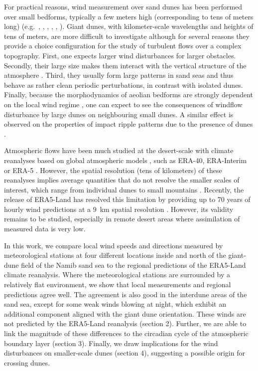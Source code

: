 For practical reasons, wind measurement over sand dunes has been performed over small bedforms, typically a few meters high (corresponding to tens of meters long) (e.g.~\citet{Lancaster1996}, \citet{MckennaNeuman1997}, \citet{Sauermann2003}, \citet{Andreotti2002}, \citet{Walker2002}, \citet{Weaver2011}). Giant dunes, with kilometer-scale wavelengths and heights of tens of meters, are more difficult to investigate although for several reasons they provide a choice configuration for the study of turbulent flows over a complex topography. First, one expects larger wind disturbances for larger obstacles. Secondly, their large size makes them interact with the vertical structure of the atmosphere \citep{Andreotti2009}. Third, they usually form large patterns in sand seas and thus behave as rather clean periodic perturbations, in contrast with isolated dunes. Finally, because the morphodynamics of aeolian bedforms are strongly dependent on the local wind regime \citep{Livingstone2019}, one can expect to see the consequences of windflow disturbance by large dunes on neighbouring small dunes. A similar effect is observed on the properties of impact ripple patterns due to the presence of dunes \citep{Howard1977,Hood2021}.

Atmospheric flows have been much studied at the desert-scale with climate reanalyses based on global atmospheric models \citep{Blumberg1996, Livingstone2010, Ashkenazy2012, Jolivet2021, Hu2021}, such as ERA-40, ERA-Interim or ERA-5 \citep{Uppala2005, Dee2011, Hersbach2020}. However, the spatial resolution (tens of kilometers) of these reanalyses implies average quantities that do not resolve the smaller scales of interest, which range from individual dunes to small mountains \citep{Livingstone2010}. Recently, the release of ERA5-Land has resolved this limitation by providing up to 70 years of hourly wind predictions at a $9$~km spatial resolution \citep{munoz2021}. However, its validity remains to be studied, especially in remote desert areas where assimilation of measured data is very low.

In this work, we compare local wind speeds and directions measured by meteorological stations at four different locations inside and north of the giant-dune field of the Namib sand sea to the regional predictions of the ERA5-Land climate reanalysis. Where the meteorological stations are surrounded by a relatively flat environment, we show that local measurements and regional predictions agree well. The agreement is also good in the interdune areas of the sand sea, except for some weak winds blowing at night, which exhibit an additional component aligned with the giant dune orientation. These winds are not predicted by the ERA5-Land reanalysis (section 2). Further, we are able to link the magnitude of these differences to the circadian cycle of the atmospheric boundary layer (section 3). Finally, we draw implications for the wind disturbances on smaller-scale dunes (section 4), suggesting a possible origin for crossing dunes.


